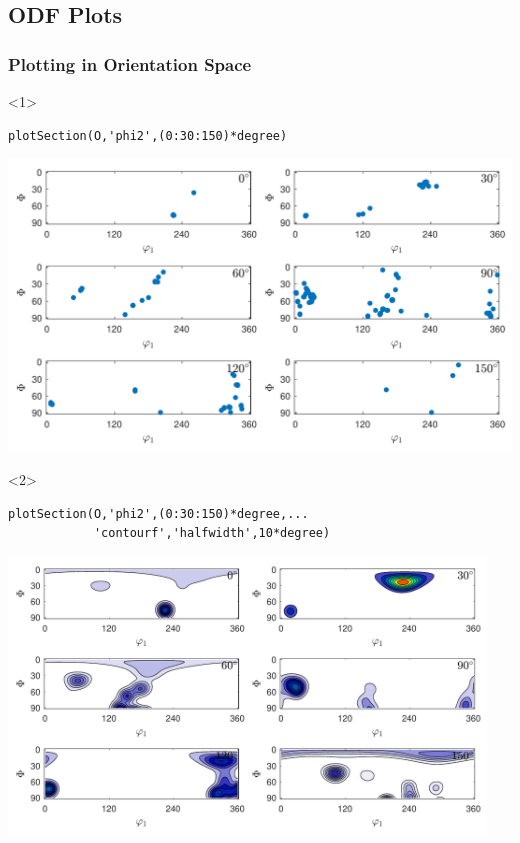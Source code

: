 \documentclass[compress]{beamer}
\begin{document}
\subsection*{ODF Plots}

\begin{frame}[fragile]
  \frametitle{Plotting in Orientation Space}

  \begin{onlyenv}<1>
    \begin{lstlisting}[style=input]
plotSection(O,'phi2',(0:30:150)*degree)
    \end{lstlisting}
    \includegraphics[width=\textwidth]{pic/odfOri}
  \end{onlyenv}

  \begin{onlyenv}<2>
    \begin{lstlisting}[style=input]
plotSection(O,'phi2',(0:30:150)*degree,...
            'contourf','halfwidth',10*degree)
    \end{lstlisting}
    \includegraphics[width=0.95\textwidth]{pic/odfOriSmooth}
  \end{onlyenv}


\end{frame}
\end{document}
